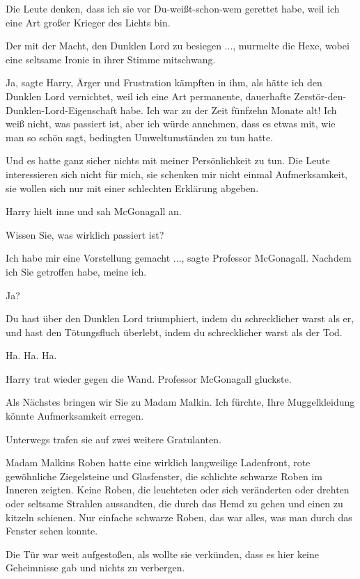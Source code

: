 \glqq{}Die Leute denken, dass ich sie vor Du-weißt-schon-wem gerettet habe, weil
ich eine Art großer Krieger des Lichts bin.\grqq{}

\glqq{}Der mit der Macht, den Dunklen Lord zu besiegen ...\grqq{}, murmelte die
Hexe, wobei eine seltsame Ironie in ihrer Stimme mitschwang.

\glqq{}Ja\grqq{}, sagte Harry, Ärger und Frustration kämpften in ihm, \glqq{}als
hätte ich den Dunklen Lord vernichtet, weil ich eine Art permanente, dauerhafte
Zerstör-den-Dunklen-Lord-Eigenschaft habe. Ich war zu der Zeit fünfzehn Monate
alt! Ich weiß nicht, was passiert ist, aber ich würde annehmen, dass es etwas
mit, wie man so schön sagt, bedingten Umweltumständen zu tun hatte. \grqq{}

\glqq{}Und es hatte ganz sicher nichts mit meiner Persönlichkeit zu tun. Die
Leute interessieren sich nicht für mich, sie schenken mir nicht einmal
Aufmerksamkeit, sie wollen sich nur mit einer schlechten Erklärung
abgeben.\grqq{}

Harry hielt inne und sah McGonagall an.

\glqq{}Wissen Sie, was wirklich passiert ist?\grqq{}

\glqq{}Ich habe mir eine Vorstellung gemacht ...\grqq{}, sagte Professor
McGonagall. \glqq{}Nachdem ich Sie getroffen habe, meine ich.\grqq{}

\glqq{}Ja?\grqq{}

\glqq{}Du hast über den Dunklen Lord triumphiert, indem du schrecklicher warst
als er, und hast den Tötungsfluch überlebt, indem du schrecklicher warst als der
Tod.\grqq{}

\glqq{}Ha. Ha. Ha.\grqq{}

Harry trat wieder gegen die Wand. Professor McGonagall gluckste.

\glqq{}Als Nächstes bringen wir Sie zu Madam Malkin. Ich fürchte, Ihre
Muggelkleidung könnte Aufmerksamkeit erregen.\grqq{}

Unterwegs trafen sie auf zwei weitere Gratulanten.

Madam Malkins Roben hatte eine wirklich langweilige Ladenfront, rote gewöhnliche
Ziegelsteine und Glasfenster, die schlichte schwarze Roben im Inneren zeigten.
Keine Roben, die leuchteten oder sich veränderten oder drehten oder seltsame
Strahlen aussandten, die durch das Hemd zu gehen und einen zu kitzeln schienen.
Nur einfache schwarze Roben, das war alles, was man durch das Fenster sehen
konnte.

Die Tür war weit aufgestoßen, als wollte sie verkünden, dass es hier keine
Geheimnisse gab und nichts zu verbergen.

